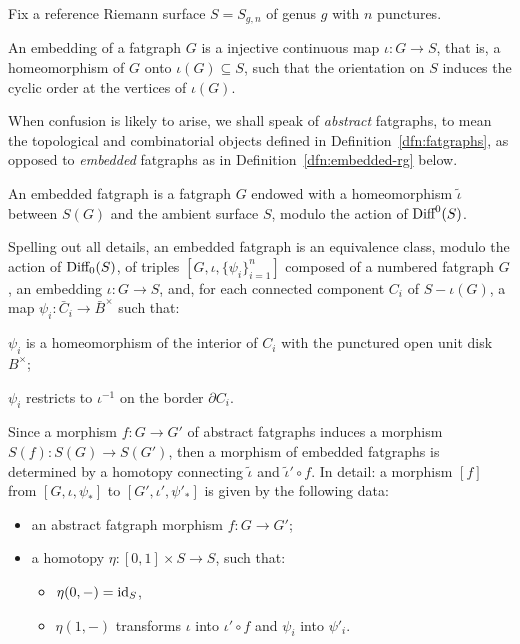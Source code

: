 Fix a reference Riemann surface $S = S_{g,n}$ of genus $g$ with $n$
punctures.

An embedding of a fatgraph $G$ is a injective continuous map $\iota:G\to
S$, that is, a homeomorphism of $G$ onto $\iota(G) \subseteq S$, such that the
orientation on $S$ induces the cyclic order at the vertices of $\iota(G)$.

When confusion is likely to arise, we shall speak of \emph{abstract}
fatgraphs, to mean the topological and combinatorial objects
defined in Definition~\ref{dfn:fatgraphs}, as opposed to \emph{embedded}
fatgraphs as in Definition~\ref{dfn:embedded-rg} below.

\begin{definition}\label{dfn:embedded-rg}
  An embedded fatgraph is a fatgraph $G$ endowed with a
  homeomorphism ${\tilde \iota}$ between $S(G)$ and the ambient
  surface $S$, modulo the action of $\textrm{Diff}^0(S)$.
\end{definition}
Spelling out all details, an embedded fatgraph is an equivalence
class, modulo the action of $\textrm{Diff}_0(S)$, of triples $[G, \iota,
\{\psi_i\}_{i=1}^n]$ composed of a numbered fatgraph $G$, an
embedding $\iota:G\to S$, and, for each connected component $C_i$ of
$S - \iota(G)$, a map $\psi_i: {\bar C_i} \to {\bar B}^\times$ such
that:
\begin{inparaenum}[\slshape (1)]
\item $\psi_i$ is a homeomorphism of the interior of $C_i$ with the
  punctured open unit disk $B^\times$;
\item $\psi_i$ restricts to $\iota^{-1}$ on the border $\partial C_i$.
\end{inparaenum}

Since a morphism $f:G\to G'$ of abstract fatgraphs induces a morphism
$S(f):S(G)\to S(G')$, then a morphism of embedded fatgraphs is
determined by a homotopy connecting ${\tilde \iota}$ and ${\tilde
  \iota' \circ f}$.  In detail: a morphism $[f]$ from $[G, \iota,
\psi_*]$ to $[G', \iota', \psi'_*]$ is given by the following data:
\begin{itemize}
\item an abstract fatgraph morphism $f:G\to G'$;
\item a homotopy $\eta:[0,1] \times S\to S$, such that:
  \begin{itemize}
  \item $\eta(0,-) = \operatorname{id}_S$,
  \item $\eta(1,-)$ transforms $\iota$ into $\iota' \circ f$
    and $\psi_i$ into $\psi'_i$.
  \end{itemize}

\end{itemize}

